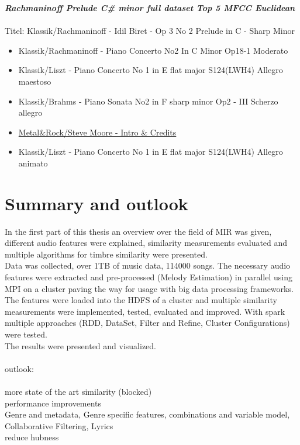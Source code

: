 \textit{\textbf{Rachmaninoff Prelude C\# minor full dataset Top 5 MFCC Euclidean\\}}
\\
Titel: Klassik/Rachmaninoff - Idil Biret - Op 3 No 2 Prelude in C - Sharp Minor
\begin{itemize}
	\setlength\itemsep{-0.5em}
	\item Klassik/Rachmaninoff - Piano Concerto No2 In C Minor Op18-1 Moderato
	\item Klassik/Liszt - Piano Concerto No 1 in E flat major S124(LWH4) Allegro maestoso
	\item Klassik/Brahms - Piano Sonata No2 in F sharp minor Op2 - III Scherzo allegro
	\item \underline{Metal\&Rock/Steve Moore - Intro \& Credits}
	\item Klassik/Liszt - Piano Concerto No 1 in E flat major S124(LWH4) Allegro animato
\end{itemize}

\section{Summary and outlook}

In the first part of this thesis an overview over the field of MIR was given, different audio features were explained, similarity measurements evaluated and multiple algorithms for timbre similarity were presented.\\
Data was collected, over 1TB of music data, 114000 songs. The necessary audio features were extracted and pre-processed (Melody Estimation) in parallel using MPI on a cluster paving the way for usage with big data processing frameworks.\\
The features were loaded into the HDFS of a cluster and multiple similarity measurements were implemented, tested, evaluated and improved. With spark multiple approaches (RDD, DataSet, Filter and Refine, Cluster Configurations) were tested.\\
The results were presented and visualized.\\
\ \\
outlook:\\
\ \\
more state of the art similarity (blocked)\\
performance improvements\\
Genre and metadata, Genre specific features, combinations and variable model, Collaborative Filtering, Lyrics\\
reduce hubness\\

